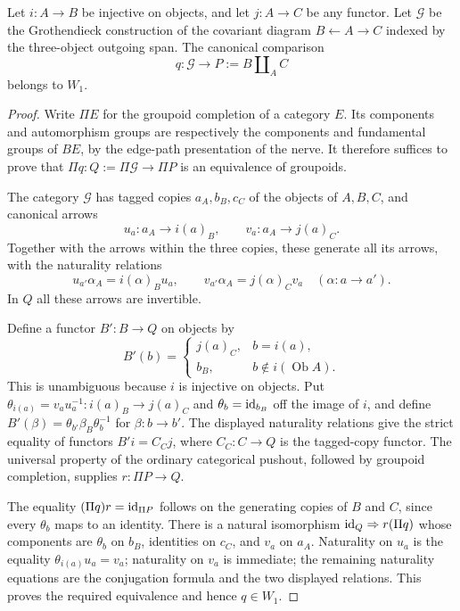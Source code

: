 \begin{lemma}\label{F:span-groupoid}
Let $i:A\to B$ be injective on objects, and let $j:A\to C$ be any functor.
Let $\mathcal G$ be the Grothendieck construction of the covariant
diagram $B\leftarrow A\to C$ indexed by the three-object outgoing
span. The canonical comparison
\[
 q:\mathcal G\longrightarrow P:=B\amalg_A C
\]
belongs to $W_1$.
\end{lemma}
\begin{proof}
Write $\Pi E$ for the groupoid completion of a category $E$.
Its components and automorphism groups are respectively the components
and fundamental groups of $BE$, by the edge-path presentation of the
nerve. It therefore suffices to prove that
$\Pi q:Q:=\Pi\mathcal G\to\Pi P$ is an equivalence of groupoids.

The category $\mathcal G$ has tagged copies $a_A,b_B,c_C$ of the objects
of $A,B,C$, and canonical arrows
\[
 u_a:a_A\longrightarrow i(a)_B,\qquad
 v_a:a_A\longrightarrow j(a)_C.
\]
Together with the arrows within the three copies, these generate all
its arrows, with the naturality relations
\[
 u_{a'}\alpha_A=i(\alpha)_B u_a,\qquad
 v_{a'}\alpha_A=j(\alpha)_C v_a
 \quad(\alpha:a\to a').
\]
In $Q$ all these arrows are invertible.

Define a functor $B':B\to Q$ on objects by
\[
 B'(b)=
 \begin{cases}
 j(a)_C,&b=i(a),\\
 b_B,&b\notin i(\operatorname{Ob}A).
 \end{cases}
\]
This is unambiguous because $i$ is injective on objects. Put
$\theta_{i(a)}=v_a u_a^{-1}:i(a)_B\to j(a)_C$ and
$\theta_b=\mathrm{id}_{b_B}$ off the image of $i$, and define
$B'(\beta)=\theta_{b'}\beta_B\theta_b^{-1}$ for $\beta:b\to b'$.
The displayed naturality relations give the strict equality of
functors $B'i=C_{\!C}j$, where $C_{\!C}:C\to Q$ is the tagged-copy
functor. The universal property of the ordinary categorical pushout,
followed by groupoid completion, supplies
$r:\Pi P\to Q$.

The equality $(\Pi q)r=\mathrm{id}_{\Pi P}$ follows on the generating copies
of $B$ and $C$, since every $\theta_b$ maps to an identity.
There is a natural isomorphism
$\mathrm{id}_Q\Rightarrow r(\Pi q)$ whose components are $\theta_b$ on
$b_B$, identities on $c_C$, and $v_a$ on $a_A$.
Naturality on $u_a$ is the equality $\theta_{i(a)}u_a=v_a$;
naturality on $v_a$ is immediate; the remaining naturality equations
are the conjugation formula and the two displayed relations.
This proves the required equivalence and hence $q\in W_1$.
\end{proof}

